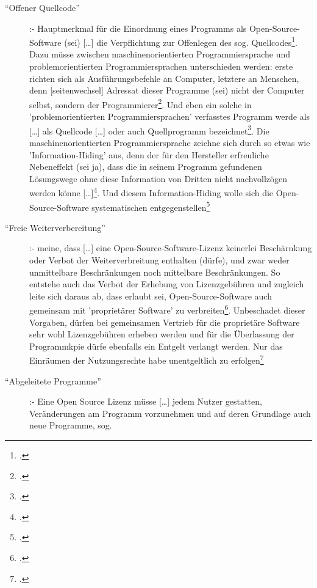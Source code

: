 \documentclass[DIV=calc,BCOR=5mm,11pt,headings=small,oneside,abstract=true, toc=bib]{scrartcl}
\begin{document}
\begin{description}
  \item[``Offener Quellcode''] :- \glqq{}Hauptmerkmal für die
  Einordnung eines Programms als Open-Source-Software (sei) [\ldots] die
  Verpflichtung zur Offenlegen des sog.
  Quellcodes\grqq{}\footcite[vgl.][11]{Oberhem2008a}. Dazu müsse zwischen
  \glqq{}maschinenorientierten Programmiersprache\grqq{} und
  \glqq{}problemorientierten Programmiersprachen\grqq{} unterschieden werden:
  erste richten sich als Ausführungsbefehle an Computer, letztere an Menschen,
  denn [seitenwechsel] \glqq{}Adressat dieser Programme (sei) nicht der Computer
  selbst, sondern der Programmierer\grqq{}\footcite[vgl.][12f]{Oberhem2008a}.
  Und eben ein solche in 'problemorientierten Programmiersprachen' verfasstes
  Programm werde als \glqq{}[\ldots] als Quellcode [\ldots] oder auch
  Quellprogramm bezeichnet\grqq{}\footcite[vgl.][13]{Oberhem2008a}. Die
  \glqq{}maschinenorientierten Programmiersprache\grqq{} zeichne sich durch so
  etwas wie 'Information-Hiding' aus, denn \glqq{}der für den Hersteller
  erfreuliche Nebeneffekt (sei ja), dass die in seinem Programm
  gefundenen Lösungswege ohne diese Information von Dritten nicht
  nachvollzögen werden könne [\ldots]\grqq{}\footcite[vgl.][12]{Oberhem2008a}.
  Und diesem Information-Hiding wolle sich die Open-Source-Software
  systematischen entgegenstellen\footcite[vgl.][13]{Oberhem2008a}
  \item[``Freie Weiterverbereitung''] :- meine, dass \glqq{}[\ldots]
  eine Open-Source-Software-Lizenz keinerlei Beschärnkung oder Verbot der
  Weiterverbreitung enthalten (dürfe)\grqq{}, und zwar weder
  \glqq{}unmittelbare Beschränkungen\grqq{} noch \glqq{}mittelbare
  Beschränkungen\grqq{}. So entstehe auch das \glqq{}Verbot der Erhebung
  von Lizenzgebühren\grqq{} und zugleich leite sich daraus ab, dass erlaubt sei,
  Open-Source-Software auch gemeinsam mit  'proprietärer Software' zu
  verbreiten\footcite[vgl.][13]{Oberhem2008a}. Unbeschadet dieser Vorgaben,
  dürfen bei gemeinsamen Vertrieb für die proprietäre Software sehr wohl
  Lizenzgebühren erheben werden und für \glqq{}die Überlassung der
  Programmkpie\grqq{} dürfe ebenfalls ein Entgelt verlangt werden. Nur das
  \glqq{}Einräumen der Nutzungsrechte\grqq{} habe unentgeltlich zu
  erfolgen\footcite[vgl.][14]{Oberhem2008a}
  \item[``Abgeleitete Programme''] :- Eine Open Source Lizenz müsse
  \glqq{}[\ldots] jedem Nutzer gestatten, Veränderungen am Programm
  vorzunehmen und auf deren Grundlage auch neue Programme, sog.

\end{description}
\end{document}
